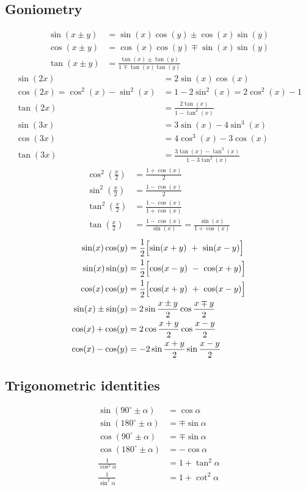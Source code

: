 \subsection{Goniometry}
\begin{align*}
    \sin(x\pm y)&=\sin(x)\cos(y)\pm\cos(x)\sin(y)\\
    \cos(x\pm y)&=\cos(x)\cos(y)\mp\sin(x)\sin(y)\\
    \tan(x\pm y)&=\frac{\tan(x)\pm\tan(y)}{1\mp\tan(x)\tan(y)}
\end{align*}
\begin{align*}
    \sin(2x)&=2\sin(x)\cos(x)\\
    \cos(2x)=\cos^2(x)-\sin^2(x)&=1-2\sin^2(x)=2\cos^2(x)-1\\
    \tan(2x)&=\frac{2\tan(x)}{1-\tan^2(x)}\\
    \sin(3x)&=3\sin(x)-4\sin^3(x)\\
    \cos(3x)&=4\cos^3(x)-3\cos(x)\\
    \tan(3x)&=\frac{3\tan(x)-\tan^3(x)}{1-3\tan^2(x)}
\end{align*}
\begin{align*}
    \cos^2\left(\frac x2\right)&=\frac{1+\cos(x)}{2}\\
    \sin^2\left(\frac x2\right)&=\frac{1-\cos(x)}{2}\\
    \tan^2\left(\frac{x}{2}\right)&=\frac{1-\cos(x)}{1+\cos(x)}\\
    \tan\left(\frac x2\right)&=\frac{1-\cos(x)}{\sin(x)}=\frac{\sin(x)}{1+\cos(x)}
\end{align*}
\begin{align*}
    \sin(x)\cos(y)&=\frac12\Bigl[\sin(x+y)~+~\sin(x-y)\Bigr]\\
    \sin(x)\sin(y)&=\frac12\Bigl[\cos(x-y)~-~\cos(x+y)\Bigr]\\
    \cos(x)\cos(y)&=\frac12\Bigl[\cos(x+y)~+~\cos(x-y)\Bigr]\\
    \sin(x)\pm\sin(y)&=2\sin\frac{x\pm y}{2}\cos\frac{x \mp y}{2}\\
    \cos(x)+\cos(y)&=2\cos\frac{x+y}{2}\cos\frac{x-y}{2}\\
    \cos(x)-\cos(y)&=-2\sin\frac{x+y}{2}\sin\frac{x-y}{2}
\end{align*}

\subsection{Trigonometric identities}
\begin{align*}
    \sin(90^\circ\pm\alpha)&=\cos\alpha\\
    \sin(180^\circ\pm\alpha)&=\mp\sin\alpha\\
    \cos(90^\circ\pm\alpha)&=\mp\sin\alpha\\
    \cos(180^\circ\pm\alpha)&=-\cos\alpha\\
    \frac{1}{\cos^2 \alpha}&=1+\tan^2 \alpha\\
    \frac{1}{\sin^2 \alpha}&=1+\cot^2 \alpha\\
\end{align*}

